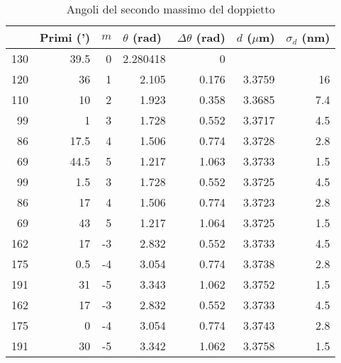 \documentclass[a4paper,10pt]{article}
\begin{document}
	\begin{table}[htbp]
  \centering
  \caption{Angoli del secondo massimo del doppietto}
  	\medskip
    \begin{tabular}{rrrrrrr}
    \bottomrule
    \rowcolor[rgb]{ .267,  .447,  .769} \multicolumn{1}{l}{\textcolor[rgb]{ 1,  1,  1}{\textbf{Gradi (deg)}}} & \multicolumn{1}{l}{\textcolor[rgb]{ 1,  1,  1}{\textbf{Primi (')}}} & \multicolumn{1}{l}{\textcolor[rgb]{ 1,  1,  1}{\textbf{$m$}}} & \multicolumn{1}{l}{\textcolor[rgb]{ 1,  1,  1}{\textbf{$\theta$ (rad)}}} & \multicolumn{1}{l}{\textcolor[rgb]{ 1,  1,  1}{\textbf{$\Delta \theta$ (rad)}}} & \multicolumn{1}{l}{\textcolor[rgb]{ 1,  1,  1}{\textbf{$d$ ($ \mu $m)}}} & \multicolumn{1}{l}{\textcolor[rgb]{ 1,  1,  1}{\textbf{$\sigma _d$ (nm)}}} \\
    \toprule
    \rowcolor[rgb]{ .851,  .851,  .851} 130   & 39.5  & 0     & 2.280418 & 0     &       &  \\
    120   & 36    & 1     & 2.105 & 0.176 & 3.3759 & 16 \\
    \rowcolor[rgb]{ .851,  .851,  .851} 110   & 10    & 2     & 1.923 & 0.358 & 3.3685 & 7.4 \\
    99    & 1     & 3     & 1.728 & 0.552 & 3.3717 & 4.5 \\
    \rowcolor[rgb]{ .851,  .851,  .851} 86    & 17.5  & 4     & 1.506 & 0.774 & 3.3728 & 2.8\\
    69    & 44.5  & 5     & 1.217 & 1.063 & 3.3733 & 1.5 \\
    \rowcolor[rgb]{ .851,  .851,  .851} 99    & 1.5   & 3     & 1.728 & 0.552 & 3.3725 & 4.5 \\
    86    & 17    & 4     & 1.506 & 0.774 & 3.3723 & 2.8 \\
    \rowcolor[rgb]{ .851,  .851,  .851} 69    & 43    & 5     & 1.217 & 1.064 & 3.3725 & 1.5 \\
    162   & 17    & -3    & 2.832 & 0.552 & 3.3733 & 4.5 \\
    \rowcolor[rgb]{ .851,  .851,  .851} 175   & 0.5   & -4    & 3.054 & 0.774 & 3.3738 & 2.8 \\
    191   & 31    & -5    & 3.343 & 1.062 & 3.3752 & 1.5 \\
    \rowcolor[rgb]{ .851,  .851,  .851} 162   & 17    & -3    & 2.832 & 0.552 & 3.3733 & 4.5 \\
    175   & 0     & -4    & 3.054 & 0.774 & 3.3743 & 2.8 \\
    \rowcolor[rgb]{ .851,  .851,  .851} 191   & 30    & -5    & 3.342 & 1.062 & 3.3758 & 1.5 \\
    \toprule
    \end{tabular}%
  \label{tab2}%
\end{table}%
\end{document}
